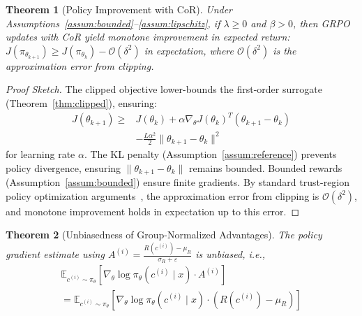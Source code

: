 \documentclass{article}
\theoremstyle{plain}
\newtheorem{theorem}{Theorem}[section]
\theoremstyle{definition}
\theoremstyle{remark}
\begin{document}
\begin{theorem}[Policy Improvement with CoR]
\label{thm:improvement}
Under Assumptions~\ref{assum:bounded}--\ref{assum:lipschitz}, if $\lambda \geq 0$ and $\beta > 0$, then GRPO updates with CoR yield monotone improvement in expected return: $J(\pi_{\theta_{k+1}}) \geq J(\pi_{\theta_k}) - \mathcal{O}(\delta^2)$ in expectation, where $\mathcal{O}(\delta^2)$ is the approximation error from clipping.
\end{theorem}

\begin{proof}[Proof Sketch]
The clipped objective lower-bounds the first-order surrogate (Theorem~\ref{thm:clipped}), ensuring:
\begin{align}
J(\theta_{k+1}) \geq{}& J(\theta_k) + \alpha \nabla_\theta J(\theta_k)^T (\theta_{k+1} - \theta_k) \nonumber \\
&- \frac{L\alpha^2}{2}\|\theta_{k+1} - \theta_k\|^2
\end{align}
for learning rate $\alpha$. The KL penalty (Assumption~\ref{assum:reference}) prevents policy divergence, ensuring $\|\theta_{k+1} - \theta_k\|$ remains bounded. Bounded rewards (Assumption~\ref{assum:bounded}) ensure finite gradients. By standard trust-region policy optimization arguments~\citep{schulman2017proximal}, the approximation error from clipping is $\mathcal{O}(\delta^2)$, and monotone improvement holds in expectation up to this error.
\end{proof}

\begin{theorem}[Unbiasedness of Group-Normalized Advantages]
\label{thm:unbiased}
The policy gradient estimate using $A^{(i)} = \frac{R(c^{(i)}) - \mu_R}{\sigma_R + \varepsilon}$ is unbiased, i.e.,
\begin{align}
\mathbb{E}_{c^{(i)} \sim \pi_\theta} \left[\nabla_\theta \log \pi_\theta(c^{(i)} \mid x) \cdot A^{(i)}\right] \nonumber \\
= \mathbb{E}_{c^{(i)} \sim \pi_\theta} \left[\nabla_\theta \log \pi_\theta(c^{(i)} \mid x) \cdot (R(c^{(i)}) - \mu_R)\right]
\end{align}
\end{theorem}
\end{document}
